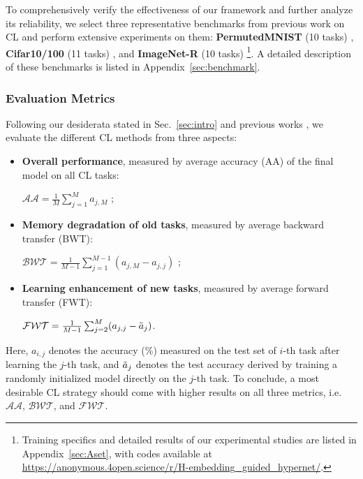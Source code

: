 To comprehensively verify the effectiveness of our framework and further analyze its reliability, we select three representative benchmarks from previous work on CL and perform extensive experiments on them: \textbf{PermutedMNIST} (10 tasks) \citep{goodfellow2013empirical}, \textbf{Cifar10/100} (11 tasks) \citep{krizhevsky2009learning}, and \textbf{ImageNet-R} (10 tasks) \citep{hendrycks2021many}\footnote{Training specifics and detailed results of our experimental studies are listed in Appendix~\ref{sec:Aset}, with codes available at \url{https://anonymous.4open.science/r/H-embedding_guided_hypernet/}.}. A detailed description of these benchmarks is listed in Appendix~\ref{sec:benchmark}.

\subsubsection{Evaluation Metrics}
Following our desiderata stated in Sec.~\ref{sec:intro} and previous works \citep{qu2021recent,wang2024comprehensive}, we evaluate the different CL methods from three aspects: 
\begin{itemize}
    \item \textbf{Overall performance}, measured by average accuracy (AA) of the final model on all CL tasks:
    \begin{center}
        $\mathcal{AA} = \frac{1}{M} \sum_{j=1}^M a_{j,M}$ ;
    \end{center}
    \item \textbf{Memory degradation of old tasks}, measured by average backward transfer (BWT): 
    \begin{center}
        $\mathcal{BWT} = \frac{1}{M-1} \sum_{j=1}^{M-1} (a_{j,M} - a_{j,j})$ ;
    \end{center}
    \item \textbf{Learning enhancement of new tasks}, measured by average forward transfer (FWT): 
    \begin{center}
        $\mathcal{FWT} = \frac{1}{M-1} \sum_{j=2}^{M} (a_{j,j} - \Tilde{a}_{j})$.        
    \end{center}
\end{itemize}
Here, $a_{i,j}$ denotes the accuracy (\%) measured on the test set of $i$-th task after learning the $j$-th task, and $\Tilde{a}_{j}$ denotes the test accuracy derived by training a randomly initialized model directly on the $j$-th task. To conclude, a most desirable CL strategy should come with higher results on all three metrics, i.e. $\mathcal{AA}$, $\mathcal{BWT}$, and $\mathcal{FWT}$.



